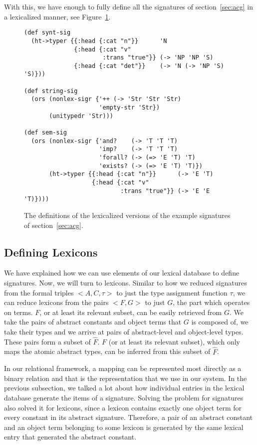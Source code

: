 With this, we have enough to fully define all the signatures of
section~\ref{sec:acg} in a lexicalized manner, see
Figure~\ref{fig:example-sig-impl}.

\begin{figure}
  \centering
\begin{verbatim}
(def synt-sig
  (ht->typer {{:head {:cat "n"}}      'N
              {:head {:cat "v"
                      :trans "true"}} (-> 'NP 'NP 'S)
              {:head {:cat "det"}}    (-> 'N (-> 'NP 'S) 'S)}))

(def string-sig
  (ors (nonlex-sigr {'++ (-> 'Str 'Str 'Str)
                     'empty-str 'Str})
       (unitypedr 'Str)))

(def sem-sig
  (ors (nonlex-sigr {'and?    (-> 'T 'T 'T)
                     'imp?    (-> 'T 'T 'T)
                     'forall? (-> (=> 'E 'T) 'T)
                     'exists? (-> (=> 'E 'T) 'T)})
       (ht->typer {{:head {:cat "n"}}      (-> 'E 'T)
                   {:head {:cat "v"
                           :trans "true"}} (-> 'E 'E 'T)})))
\end{verbatim}
  \caption{\label{fig:example-sig-impl} The definitions of the
    lexicalized versions of the example signatures of
    section~\ref{sec:acg}.}
\end{figure}


\subsection{Defining Lexicons}

We have explained how we can use elements of our lexical database to
define signatures. Now, we will turn to lexicons. Similar to how we
reduced signatures from the formal triples $\mathopen{<}A, C,
\tau\mathclose{>}$ to just the type assignment function $\tau$, we can
reduce lexicons from the pairs $\mathopen{<}F, G\mathclose{>}$ to just
$G$, the part which operates on terms. $F$, or at least its relevant
subset, can be easily retrieved from $G$. We take the pairs of abstract
constants and object terms that $G$ is composed of, we take their types
and we arrive at pairs of abstract-level and object-level types. These
pairs form a subset of $\hat{F}$. $F$ (or at least its relevant subset),
which only maps the atomic abstract types, can be inferred from this
subset of $\hat{F}$.

In our relational framework, a mapping can be represented most directly
as a binary relation and that is the representation that we use in our
system. In the previous subsection, we talked a lot about how individual
entries in the lexical database generate the items of a
signature. Solving the problem for signatures also solved it for
lexicons, since a lexicon contains exactly one object term for every
constant in its abstract signature. Therefore, a pair of an abstract
constant and an object term belonging to some lexicon is generated by
the same lexical entry that generated the abstract constant.

